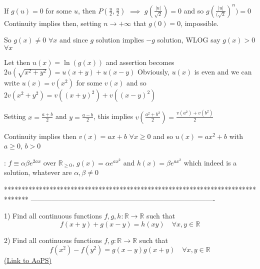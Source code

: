 \begin{solution}
If $g(u)=0$ for some $u$, then $P(\frac u2,\frac u2)$ $\implies$ $g(\frac{|u|}{\sqrt 2})=0$  and so  $g(\frac{|u|}{(\sqrt 2})^n)=0$ 
Continuity implies then, setting $n\to +\infty$ that $g(0)=0$, impossible.

So $g(x)\ne 0$ $\forall x$ and since $g$ solution implies $-g$ solution, WLOG say $g(x)>0$ $\forall x$

Let then $u(x)=\ln(g(x))$ and assertion becomes $2u(\sqrt{x^2+y^2})=u(x+y)+u(x-y)$
Obviously, $u(x)$ is even and we can write $u(x)=v(x^2)$ for some $v(x)$ and so $2v(x^2+y^2)=v((x+y)^2)+v((x-y)^2)$

Setting $x=\frac{a+b}2$ and $y=\frac {a-b}2$, this implies $v(\frac{a^2+b^2}2)=\frac{v(a^2)+v(b^2)}2$

Continuity implies then $v(x)=ax+b$ $\forall x\ge 0$ and so $u(x)=ax^2+b$ with $a\ge 0$, $b>0$

: $f\equiv \alpha\beta e^{2ax}$ over $\mathbb R_{\ge 0}$, $g(x)=\alpha e^{ax^2}$ and $h(x)=\beta e^{ax^2}$ which indeed is a solution, whatever are $\alpha,\beta\ne 0$
\end{solution}
*******************************************************************************
-------------------------------------------------------------------------------

\begin{problem}
	1) Find all continuous functions $f,g,h:\mathbb{R}\to\mathbb{R}$ such that 
\[f(x+y)+g(x-y)=h(xy)\quad \forall x,y\in\mathbb{R}\]

2) Find all continuous functions $f,g:\mathbb{R}\to\mathbb{R}$ such that 
\[f(x^2)-f(y^2)=g(x-y)g(x+y) \quad \forall x,y\in\mathbb{R}\]
	\flushright \href{https://artofproblemsolving.com/community/c6h564899}{(Link to AoPS)}
\end{problem}



